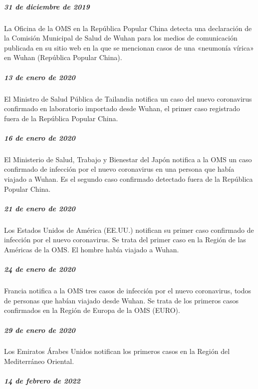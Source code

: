 \documentclass[
  12pt,
]{article}
\begin{document}
\hypertarget{de-diciembre-de-2019}{%
\subparagraph{\texorpdfstring{\textbf{31 de diciembre de
2019}}{31 de diciembre de 2019}}\label{de-diciembre-de-2019}}

La Oficina de la OMS en la República Popular China detecta una
declaración de la Comisión Municipal de Salud de Wuhan para los medios
de comunicación publicada en su sitio web en la que se mencionan casos
de una «neumonía vírica» en Wuhan (República Popular China).

\hypertarget{de-enero-de-2020}{%
\subparagraph{\texorpdfstring{\textbf{13 de enero de
2020}}{13 de enero de 2020}}\label{de-enero-de-2020}}

El Ministro de Salud Pública de Tailandia notifica un caso del nuevo
coronavirus confirmado en laboratorio importado desde Wuhan, el primer
caso registrado fuera de la República Popular China.

\hypertarget{de-enero-de-2020-1}{%
\subparagraph{\texorpdfstring{\textbf{16 de enero de
2020}}{16 de enero de 2020}}\label{de-enero-de-2020-1}}

El Ministerio de Salud, Trabajo y Bienestar del Japón notifica a la OMS
un caso confirmado de infección por el nuevo coronavirus en una persona
que había viajado a Wuhan. Es el segundo caso confirmado detectado fuera
de la República Popular China.

\hypertarget{de-enero-de-2020-2}{%
\subparagraph{\texorpdfstring{\textbf{21 de enero de
2020}}{21 de enero de 2020}}\label{de-enero-de-2020-2}}

Los Estados Unidos de América (EE.UU.) notifican su primer caso
confirmado de infección por el nuevo coronavirus. Se trata del primer
caso en la Región de las Américas de la OMS. El hombre había viajado a
Wuhan.

\hypertarget{de-enero-de-2020-3}{%
\subparagraph{\texorpdfstring{\textbf{24 de enero de
2020}}{24 de enero de 2020}}\label{de-enero-de-2020-3}}

Francia notifica a la OMS tres casos de infección por el nuevo
coronavirus, todos de personas que habían viajado desde Wuhan. Se trata
de los primeros casos confirmados en la Región de Europa de la OMS
(EURO).

\hypertarget{de-enero-de-2020-4}{%
\subparagraph{\texorpdfstring{\textbf{29 de enero de
2020}}{29 de enero de 2020}}\label{de-enero-de-2020-4}}

Los Emiratos Árabes Unidos notifican los primeros casos en la Región del
Mediterráneo Oriental.

\hypertarget{de-febrero-de-2022}{%
\subparagraph{\texorpdfstring{\textbf{14 de febrero de
2022}}{14 de febrero de 2022}}\label{de-febrero-de-2022}}
\end{document}
